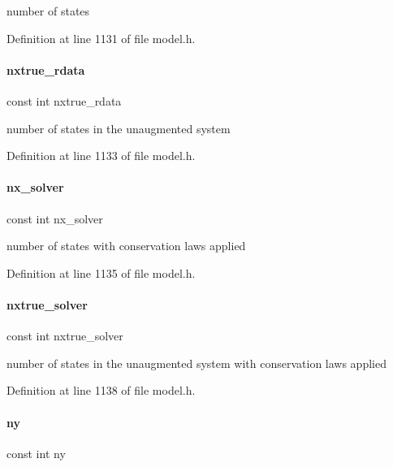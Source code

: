 number of states 

Definition at line 1131 of file model.\+h.

\mbox{\label{classamici_1_1_model_a6315a521b453351fc77c7f37192f97e7}} 
\paragraph{\texorpdfstring{nxtrue\_rdata}{nxtrue\_rdata}}
{\footnotesize\ttfamily const int nxtrue\+\_\+rdata}

number of states in the unaugmented system 

Definition at line 1133 of file model.\+h.

\mbox{\label{classamici_1_1_model_a3a6f34c755e990967cc756b92f406373}} 
\paragraph{\texorpdfstring{nx\_solver}{nx\_solver}}
{\footnotesize\ttfamily const int nx\+\_\+solver}

number of states with conservation laws applied 

Definition at line 1135 of file model.\+h.

\mbox{\label{classamici_1_1_model_a4e4446d682ef66ca9902dfbd252bc69c}} 
\paragraph{\texorpdfstring{nxtrue\_solver}{nxtrue\_solver}}
{\footnotesize\ttfamily const int nxtrue\+\_\+solver}

number of states in the unaugmented system with conservation laws applied 

Definition at line 1138 of file model.\+h.

\mbox{\label{classamici_1_1_model_a811734e12750524808dba01c57e92c66}} 
\paragraph{\texorpdfstring{ny}{ny}}
{\footnotesize\ttfamily const int ny}

